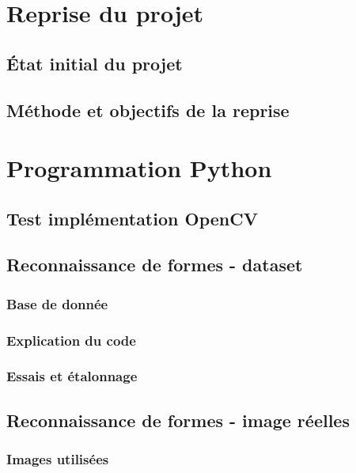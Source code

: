 \section{Reprise du projet}

\subsection{État initial du projet}
	
\subsection{Méthode et objectifs de la reprise}


\clearpage
\section{Programmation Python}

\subsection{Test implémentation OpenCV}

\subsection{Reconnaissance de formes - dataset}

	\subsubsection{Base de donnée}

	\subsubsection{Explication du code}
	
	\subsubsection{Essais et étalonnage}
	
\clearpage	
\subsection{Reconnaissance de formes - image réelles}

	\subsubsection{Images utilisées}
	

